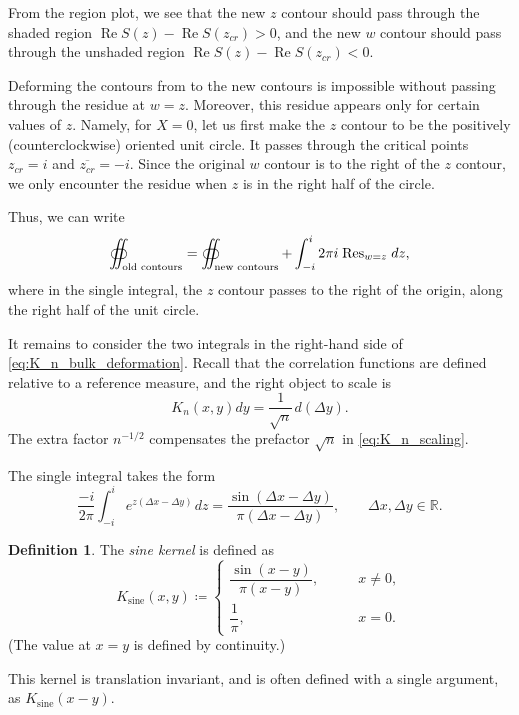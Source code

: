 \documentclass[letterpaper,11pt,oneside,reqno]{article}
\numberwithin{equation}{section}
\newcommand{\ssp}{\hspace{1pt}}
\theoremstyle{definition}
\newtheorem{definition}[proposition]{Definition}
\begin{document}
From the region plot, we see that the new $z$ contour should
pass through the shaded region $\operatorname{Re}S(z)-\operatorname{Re}S(z_{cr})>0$,
and the new $w$ contour should pass through the unshaded region
$\operatorname{Re}S(z)-\operatorname{Re}S(z_{cr})<0$.

Deforming the contours from  to the new contours
is impossible without passing through the residue at $w=z$.
Moreover, this residue appears only for certain values of $z$. Namely, for $X=0$,
let us first make the $z$ contour to be the positively (counterclockwise) oriented
unit circle.
It passes through the critical points $z_{cr}=i$ and $\overline{z_{cr}}=-i$.
Since the original $w$ contour is to the right of the $z$ contour, we only
encounter the residue when $z$ is in the right half of the circle.

Thus, we can write
\begin{equation}
	\label{eq:K_n_bulk_deformation}
	\oiint_{\textnormal{old contours}}=
	\oiint_{\textnormal{new contours}}
	+
	\int_{-i}^i 2\pi i\ssp \operatorname{Res}\limits_{w=z}\ssp dz,
\end{equation}
where in the single integral, the $z$ contour passes to the right of the origin,
along the right half of the unit circle.

It remains to consider the two integrals in the right-hand side
of \eqref{eq:K_n_bulk_deformation}.
Recall that the correlation functions are
defined relative to a reference measure, and the right object to scale is
\begin{equation*}
	K_n(x,y)dy=\frac{1}{\sqrt n}\ssp d\left( \Delta y \right).
\end{equation*}
The extra factor $n^{-1/2}$
compensates the prefactor $\sqrt n$ in
\eqref{eq:K_n_scaling}.

The single integral takes the form
\begin{equation}
	\label{eq:K_n_bulk_single}
	\frac{-i}{2\pi}
	\int_{-i}^i
	e^{z (\Delta x -\Delta y)}
	\ssp
	dz
	=\frac{\sin\left( \Delta x-\Delta y \right)}{\pi(\Delta x-\Delta y)},
	\qquad \Delta x,\Delta y\in\mathbb{R}.
\end{equation}
\begin{definition}
	\label{def:sine-kernel}
	The \emph{sine kernel} is defined as
	\begin{equation*}
		K_{\mathrm{sine}}(x,y)\coloneqq
		\begin{cases}
			\dfrac{\sin (x-y)}{\pi (x-y)},&\qquad x\ne 0,\\[10pt]
			\dfrac{1}{\pi},&\qquad x=0.
		\end{cases}
	\end{equation*}
	(The value at $x=y$ is defined by continuity.)

	This kernel is translation invariant, and is often
	defined with a single argument, as
	$K_{\mathrm{sine}}(x-y)$.
\end{definition}
\end{document}
